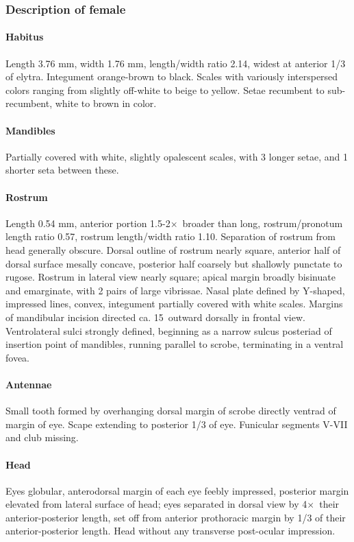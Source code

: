 \documentclass[fleqn,10pt,lineno]{wlpeerj} %
\newcommand{\td}{\textdegree~}
\newcommand{\x}{$\times$~}
\begin{document}
		\subsubsection*{Description of female}
			\paragraph{Habitus}
				Length 3.76 mm, width 1.76 mm, length/width ratio 2.14, widest at anterior 1/3 of elytra.
				Integument orange-brown to black. 
				Scales with variously interspersed colors ranging from slightly off-white to beige to yellow. 
				Setae recumbent to sub-recumbent, white to brown in color.
			\paragraph{Mandibles}
				Partially covered with white, slightly opalescent scales, with 3 longer setae, and 1 shorter seta between these.
			\paragraph{Rostrum}
				Length 0.54 mm, anterior portion 1.5-2\x broader than long, rostrum/pronotum length ratio 0.57, rostrum length/width ratio 1.10.
				Separation of rostrum from head generally obscure. 
				Dorsal outline of rostrum nearly square, anterior half of dorsal surface mesally concave, posterior half coarsely but shallowly punctate to rugose. 
				Rostrum in lateral view nearly square; apical margin broadly bisinuate and emarginate, with 2 pairs of large vibrissae. 
				Nasal plate defined by Y-shaped, impressed lines, convex, integument partially covered with white scales.
				Margins of mandibular incision directed ca. 15\td outward dorsally in frontal view. 
				Ventrolateral sulci strongly defined, beginning as a narrow sulcus posteriad of insertion point of mandibles, running parallel to scrobe, terminating in a ventral fovea.
			\paragraph{Antennae}
				Small tooth formed by overhanging dorsal margin of scrobe directly ventrad of margin of eye.
				Scape extending to posterior 1/3 of eye.
				Funicular segments V-VII and club missing.
			\paragraph{Head}
				Eyes globular, anterodorsal margin of each eye feebly impressed, posterior margin elevated from lateral surface of head; eyes separated in dorsal view by 4\x their anterior-posterior length, set off from anterior prothoracic margin by 1/3 of their anterior-posterior length. 
				Head without any transverse post-ocular impression.
\end{document}
